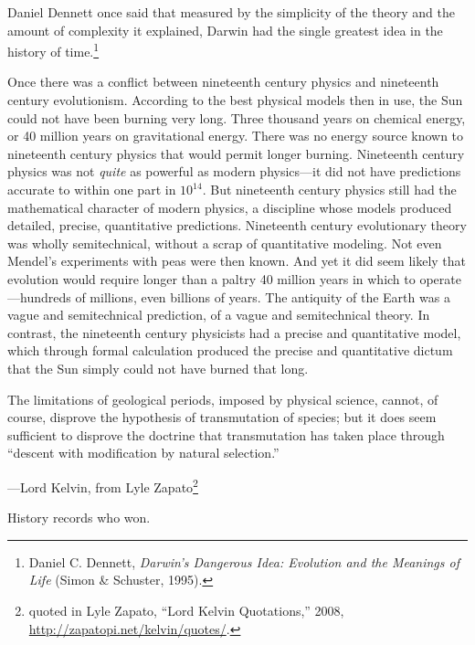 {
 Daniel Dennett once said that measured by the simplicity of the
theory and the amount of complexity it explained, Darwin had the single
greatest idea in the history of time.\footnote{Daniel C. Dennett, \textit{Darwin's Dangerous
Idea: Evolution and the Meanings of Life} (Simon \& Schuster, 1995).}}

{
 Once there was a conflict between nineteenth century physics and
nineteenth century evolutionism. According to the best physical models
then in use, the Sun could not have been burning very long. Three
thousand years on chemical energy, or 40 million years on gravitational
energy. There was no energy source known to nineteenth century physics
that would permit longer burning. Nineteenth century physics was not
\textit{quite} as powerful as modern physics---it did not have
predictions accurate to within one part in $10^{14}$. But
nineteenth century physics still had the mathematical character of
modern physics, a discipline whose models produced detailed, precise,
quantitative predictions. Nineteenth century evolutionary theory was
wholly semitechnical, without a scrap of quantitative modeling. Not
even Mendel's experiments with peas were then known.
And yet it did seem likely that evolution would require longer than a
paltry 40 million years in which to operate---hundreds of millions,
even billions of years. The antiquity of the Earth was a vague and
semitechnical prediction, of a vague and semitechnical theory. In
contrast, the nineteenth century physicists had a precise and
quantitative model, which through formal calculation produced the
precise and quantitative dictum that the Sun simply could not have
burned that long.}

{
 The limitations of geological periods, imposed by physical
science, cannot, of course, disprove the hypothesis of transmutation of
species; but it does seem sufficient to disprove the doctrine that
transmutation has taken place through ``descent with
modification by natural selection.''}

{\raggedleft
 {}---Lord Kelvin, from Lyle Zapato\footnote{quoted in Lyle Zapato, ``Lord Kelvin
Quotations,'' 2008,
\url{http://zapatopi.net/kelvin/quotes/}.}
\par}


\bigskip

{
 History records who won.}

